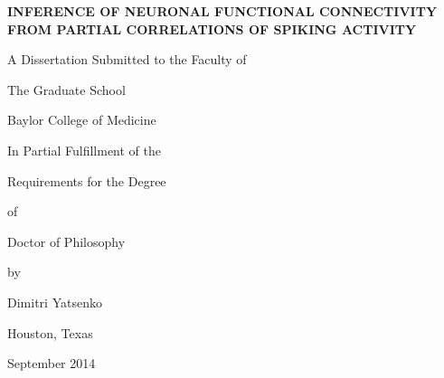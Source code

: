 \documentclass[12pt,twoside,openright]{report}
\begin{document}
\begin{titlepage}
\begin{center}

\vspace*{2cm}
\textbf{\uppercase{\large Inference of neuronal functional connectivity from partial correlations of spiking activity}}

\vspace{1.5cm}
A Dissertation Submitted to the Faculty of

\medskip
The Graduate School 

Baylor College of Medicine

\vspace{1.5cm}
In Partial Fulfillment of the 

Requirements for the Degree

of 

Doctor of Philosophy

by 

\bigskip
{\large Dimitri Yatsenko}

\vfill
Houston, Texas

September 2014

\end{center}
\end{titlepage}


\end{document}
